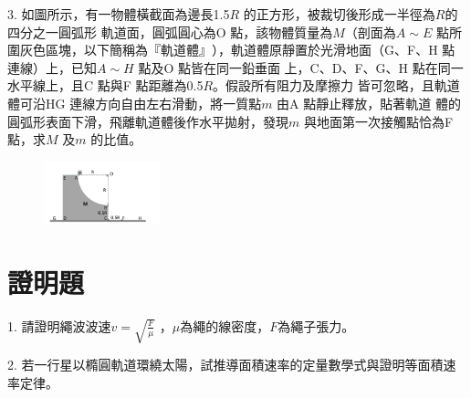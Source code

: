 \documentclass[cn,10pt,math=newtx]{elegantbook}
\begin{document}
\begin{example}
   3. 如圖所示，有一物體橫截面為邊長1.5$R$ 的正方形，被裁切後形成一半徑為$R$的四分之一圓弧形
軌道面，圓弧圓心為O 點，該物體質量為$M$（剖面為$A\sim E$ 點所圍灰色區塊，以下簡稱為$『軌道
體』$），軌道體原靜置於光滑地面（G、F、H 點連線）上，已知$A\sim H$ 點及O 點皆在同一鉛垂面
上，C、D、F、G、H 點在同一水平線上，且C 點與F 點距離為0.5$R$。假設所有阻力及摩擦力
皆可忽略，且軌道體可沿HG 連線方向自由左右滑動，將一質點$m$ 由A 點靜止釋放，貼著軌道
體的圓弧形表面下滑，飛離軌道體後作水平拋射，發現$m$ 與地面第一次接觸點恰為F 點，求$M$
及$m$ 的比值。\\
    \rightline{[全國聯招教甄109]}
\end{example}
\begin{solution}
    
\end{solution}
\begin{figure}[htbp]
    \flushright
    \includegraphics[width=0.3\textwidth]{image/109全國33.png}
  \end{figure}
\newpage

\section{證明題}


\begin{example}
   1. 請證明繩波波速$v = \sqrt{\frac{F}{\mu}}$
，$\mu$為繩的線密度，$F$為繩子張力。
\\
    \rightline{[全國聯招教甄109]}
\end{example}
\begin{solution}
    
\end{solution}

\newpage



\begin{example}
   2. 若一行星以橢圓軌道環繞太陽，試推導面積速率的定量數學式與證明等面積速率定律。\\
    \rightline{[全國聯招教甄109]}
\end{example}
\begin{solution}
    
\end{solution}
\end{document}
